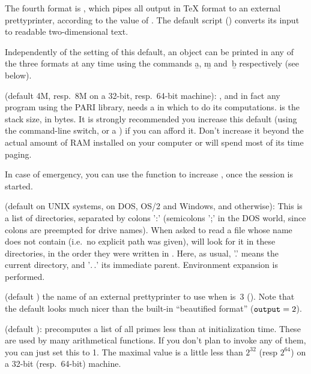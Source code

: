 The fourth format is , which pipes
all  output in TeX format to an external prettyprinter, according to the
value of . The default script () converts
its input to readable two-dimensional text.

Independently of the setting of this default, an object can be printed
in any of the three formats at any time using the commands \b{a}, \b{m}
and~\b{b} respectively (see below).

\label{se:parisize} (default 4M, resp.~8M on a 32-bit,
resp.~64-bit machine): , and in fact any program using the PARI
library, needs a  in which to do its computations. 
is the stack size, in bytes. It is strongly recommended you increase this
default (using the  command-line switch, or a ) if you can
afford it. Don't increase it beyond the actual amount of RAM installed on
your computer or  will spend most of its time paging.

In case of emergency, you can use the  function to
increase , once the session is started.

 (default  on UNIX systems,
 on DOS, OS/2 and Windows, and  otherwise):
This is a list of directories, separated by colons ':' (semicolons ';' in the
DOS world, since colons are preempted for drive names). When asked to read a
file whose name does not contain \kbd{/} (i.e.~no explicit path was given),
 will look for it in these directories, in the order they were written in
. Here, as usual, '.' means the current directory, and '$.\,.$' its
immediate parent. Environment expansion is performed.

 (default ) the name of an external prettyprinter to use when
 is~3 (). Note that the default
 looks much nicer than the built-in ``beautified
format'' (${\tt output} = 2$).

 (default ):  precomputes a list of
all primes less than  at initialization time. These are used
by many arithmetical functions. If you don't plan to invoke any of them, you
can just set this to 1. The maximal value is a little less than $2^32$
(resp $2^64$) on a 32-bit (resp.~64-bit) machine.

